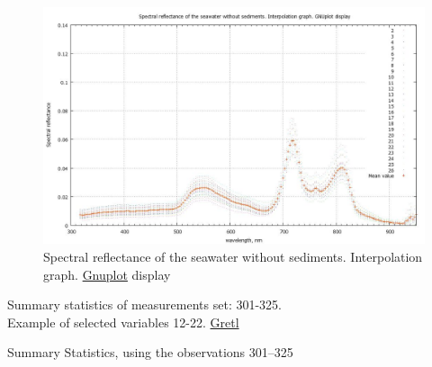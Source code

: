 \documentclass[10pt, a4paper]{article}
\begin{document}
\begin{appendices}
\begin{figure}[h]
	\begin{center}
		\includegraphics[scale=0.22]{GNU-10.jpg}
		\caption{Spectral reflectance of the seawater without sediments. Interpolation graph. \href{http://www.gnuplot.info/}{Gnuplot} display­}
		\label{fig:55}
	\end{center}
\end{figure}

\begin{table}[H]
	\begin{center}
		\caption{Summary statistics of measurements set: 301-325. \\ Example of selected variables 12-22. \href{http://gretl.sourceforge.net/}{Gretl}­}\label{tab:16}
		Summary Statistics, using the observations 301--325\\
	
	\vspace{2em}


\end{center}
\end{table}
\end{appendices}
\end{document}

